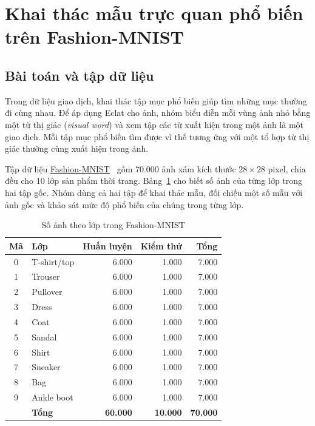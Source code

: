 \section{Khai thác mẫu trực quan phổ biến trên Fashion-MNIST}

\subsection{Bài toán và tập dữ liệu}

Trong dữ liệu giao dịch, khai thác tập mục phổ biến giúp tìm những mục thường đi cùng nhau. Để áp dụng Eclat cho ảnh, nhóm biểu diễn mỗi vùng ảnh nhỏ bằng một từ thị giác (\textit{visual word}) và xem tập các từ xuất hiện trong một ảnh là một giao dịch. Mỗi tập mục phổ biến tìm được vì thế tương ứng với một tổ hợp từ thị giác thường cùng xuất hiện trong ảnh.

Tập dữ liệu \href{https://github.com/zalandoresearch/fashion-mnist}{Fashion-MNIST}~\cite{Xiao2017} gồm 70.000 ảnh xám kích thước $28 \times 28$ pixel, chia đều cho 10 lớp sản phẩm thời trang. Bảng~\ref{tab:fashionmnist_distribution} cho biết số ảnh của từng lớp trong hai tập gốc. Nhóm dùng cả hai tập để khai thác mẫu, đối chiếu một số mẫu với ảnh gốc và khảo sát mức độ phổ biến của chúng trong từng lớp.

\begin{table}[!t]
    \centering
    \caption{Số ảnh theo lớp trong Fashion-MNIST}
    \label{tab:fashionmnist_distribution}
    \footnotesize
    \setlength{\tabcolsep}{3pt}
    \begin{tabular}{@{}c l r r r@{}}
        \hline
        \textbf{Mã} & \textbf{Lớp} & \textbf{Huấn luyện} &
        \textbf{Kiểm thử} & \textbf{Tổng} \\
        \hline
        0 & T-shirt/top  & 6.000 & 1.000 & 7.000 \\
        1 & Trouser      & 6.000 & 1.000 & 7.000 \\
        2 & Pullover     & 6.000 & 1.000 & 7.000 \\
        3 & Dress        & 6.000 & 1.000 & 7.000 \\
        4 & Coat         & 6.000 & 1.000 & 7.000 \\
        5 & Sandal       & 6.000 & 1.000 & 7.000 \\
        6 & Shirt        & 6.000 & 1.000 & 7.000 \\
        7 & Sneaker      & 6.000 & 1.000 & 7.000 \\
        8 & Bag          & 6.000 & 1.000 & 7.000 \\
        9 & Ankle boot   & 6.000 & 1.000 & 7.000 \\
        \hline
          & \textbf{Tổng} & \textbf{60.000} & \textbf{10.000} & \textbf{70.000} \\
        \hline
    \end{tabular}
\end{table}

